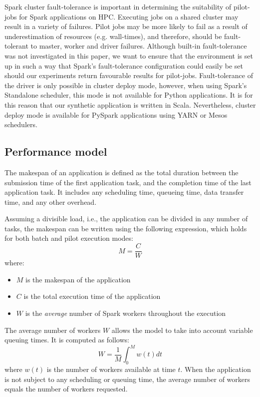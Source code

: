 	Spark cluster fault-tolerance is important in determining the suitability of
	pilot-jobs for Spark applications on HPC. Executing jobs on a shared cluster may
	result in a variety of failures. Pilot jobs may be more likely to fail as a result of
	underestimation of resources (e.g. wall-times), and therefore, should be fault-tolerant
	to master, worker and driver failures. Although built-in fault-tolerance was not
	investigated in this paper, we want to ensure that the environment is set up in such
	a way that Spark's fault-tolerance configuration could easily be set should our 
	experiments return favourable results for pilot-jobs.
	Fault-tolerance of the driver is only possible in cluster deploy mode, however,
	when using Spark's Standalone scheduler, this mode is not available for Python 
	applications. It is for this reason that our synthetic application is written
	in Scala. Nevertheless, cluster deploy mode is available for PySpark applications
	using YARN or Mesos schedulers.
    
    
	\subsection{Performance model}
    
	The makespan of an application is defined as the total duration
	between the submission time of the first application task, and the
	completion time of the last application task. It includes any
	scheduling time, queueing time, data transfer time, and any other
	overhead.
	
	Assuming a divisible load, i.e., the application can be divided in any
	number of tasks, the makespan can be written using the following
	expression, which holds for both batch and pilot execution modes:
	\begin{equation}
	    M = \frac{C}{W} \label{eq:mcw}
	\end{equation}
	where:
	\begin{itemize}
	    \item $M$ is the makespan of the application
	    \item $C$ is the total execution time of the application
	    \item $W$ is the \emph{average} number of Spark workers throughout the execution
	\end{itemize}
	The average number of workers $W$ allows the model to take into account
	 variable queuing times. It is computed as follows:
	\begin{equation}
	    W = \frac{1}{M}\int_0^M{w(t)dt}\label{eq:avgw}
	\end{equation}
	where $w(t)$ is the number of workers available at time $t$. When the
	application is not subject to any scheduling or queuing time, the
	average number of workers equals the number of workers requested. 
    
